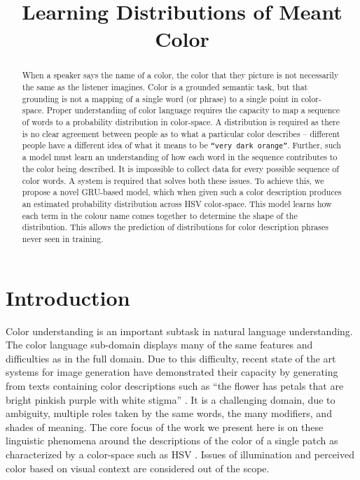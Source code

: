 \documentclass[11pt,a4paper]{article}
\title{Learning Distributions of Meant Color}
\newcommand{\parencite}{\citep}
\begin{document}
\maketitle

\begin{abstract}
When a speaker says the name of a color, the color that they picture is not necessarily the same as the listener imagines.
Color is a grounded semantic task, but that grounding is not a mapping of a single word (or phrase) to a single point in color-space.
Proper understanding of color language requires the capacity to map a sequence of words to a probability distribution in color-space.
A distribution is required as there is no clear agreement between people as to what a particular color describes -- different people have a different idea of what it means to be \texttt{``very dark orange''}.
Further, such a model must learn an understanding of how each word in the sequence contributes to the color being described.
It is impossible to collect data for every possible sequence of color words.
A system is required that solves both these issues.
To achieve this, we propose a novel GRU-based model, which when given such a color description produces an estimated probability distribution across HSV color-space.
This model learns how each term in the colour name comes together to determine the shape of the distribution.
This allows the prediction of distributions for color description phrases never seen in training.
\end{abstract}

\section{Introduction}\label{sec:intro}

Color understanding is an important subtask in natural language understanding.
The color language sub-domain displays many of the same features and difficulties as in the full domain.
Due to this difficulty, recent state of the art systems for image generation have demonstrated their capacity by generating from texts containing color descriptions such as ``the flower has petals that are bright pinkish purple with white stigma'' \parencite{reed2016generative, 2015arXiv151102793M}.
It is a challenging domain, due to ambiguity, multiple roles taken by the same words, the many modifiers, and shades of meaning.
The core focus of the work we present here is on these linguistic phenomena around the descriptions of the color of a single patch as characterized by a color-space such as HSV \parencite{smith1978color}.
Issues of illumination and perceived color based on visual context are considered out of the scope.
\end{document}
